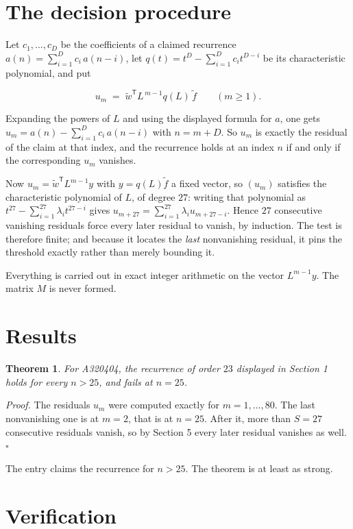 \documentclass[11pt]{article}
\newtheorem{theorem}{Theorem}
\theoremstyle{definition}
\begin{document}
\section{The decision procedure}

Let $c_1,\dots,c_D$ be the coefficients of a claimed recurrence $a(n) = \sum_{i=1}^{D} c_i\,a(n-i)$, let $q(t) = t^{D} - \sum_{i=1}^{D} c_i t^{D-i}$ be its characteristic polynomial, and put

\[u_m \;=\; \tilde w^{\mathsf T} L^{\,m-1} q(L)\,\tilde f \qquad (m \ge 1).\]

Expanding the powers of $L$ and using the displayed formula for $a$, one gets $u_m = a(n) - \sum_{i=1}^{D} c_i\,a(n-i)$ with $n = m + D$. So $u_m$ is exactly the residual of the claim at that index, and the recurrence holds at an index $n$ if and only if the corresponding $u_m$ vanishes.

Now $u_m = \tilde w^{\mathsf T} L^{m-1} y$ with $y = q(L)\tilde f$ a fixed vector, so $(u_m)$ satisfies the characteristic polynomial of $L$, of degree $27$: writing that polynomial as $t^{27} - \sum_{i=1}^{27} \lambda_i t^{27-i}$ gives $u_{m+27} = \sum_{i=1}^{27} \lambda_i u_{m+27-i}$. Hence $27$ consecutive vanishing residuals force every later residual to vanish, by induction. The test is therefore finite; and because it locates the {\itshape last} nonvanishing residual, it pins the threshold exactly rather than merely bounding it.

Everything is carried out in exact integer arithmetic on the vector $L^{m-1}y$. The matrix $M$ is never formed.

\section{Results}

\begin{theorem} For A320404, the recurrence of order $23$ displayed in Section 1 holds for every $n > 25$, and fails at $n = 25$.\end{theorem}

{\itshape Proof.} The residuals $u_m$ were computed exactly for $m = 1,\dots,80$. The last nonvanishing one is at $m = 2$, that is at $n = 25$. After it, more than $S = 27$ consecutive residuals vanish, so by Section 5 every later residual vanishes as well. $\square$

The entry claims the recurrence for $n > 25$. The theorem is at least as strong.

\section{Verification}
\end{document}
